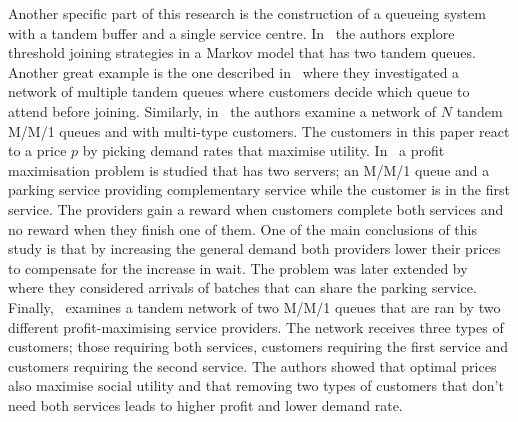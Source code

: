 Another specific part of this research is the construction of a queueing system
with a tandem buffer and a single service centre.
In~\cite{d2015pure} the authors explore threshold joining strategies in a 
Markov model that has two tandem queues.
Another great example is the one described in~\cite{burnetas2013customer}
where they investigated a network of multiple tandem queues where customers 
decide which queue to attend before joining.
Similarly, in~\cite{bacsar2002stackelberg} the authors examine a network of 
\(N\) tandem M/M/1 queues and with multi-type customers. 
The customers in this paper react to a price \(p\) by picking demand rates that 
maximise utility.
In~\cite{veltman2005equilibrium} a profit maximisation problem is studied that
has two servers; an M/M/1 queue and a parking service providing complementary 
service while the customer is in the first service. 
The providers gain a reward when customers complete both services and no reward 
when they finish one of them.
One of the main conclusions of this study is that by increasing the general 
demand both providers lower their prices to compensate for the increase in wait.
The problem was later extended by~\cite{sun2009equilibrium} where they 
considered arrivals of batches that can share the parking service.
Finally,~\cite{afeche2007decentralized} examines a tandem network of two M/M/1 
queues that are ran by two different profit-maximising service providers.
The network receives three types of customers; those requiring both services, 
customers requiring the first service and customers requiring the second service.
The authors showed that optimal prices also maximise social utility and that
removing two types of customers that don't need both services leads to higher 
profit and lower demand rate.

